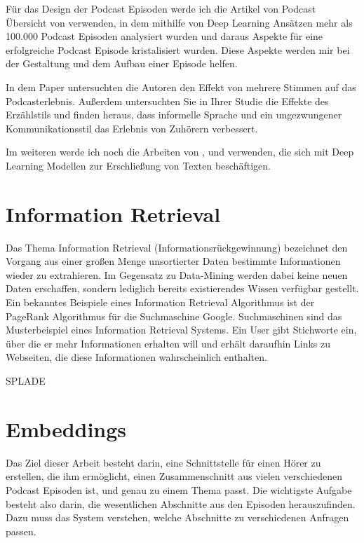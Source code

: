 Für das Design der Podcast Episoden werde ich die Artikel von Podcast Übersicht von \cite{jones2021} verwenden, in dem mithilfe von Deep Learning Ansätzen mehr als 100.000 Podcast Episoden analysiert wurden und daraus Aspekte für eine erfolgreiche Podcast Episode kristalisiert wurden. Diese Aspekte werden mir bei der Gestaltung und dem Aufbau einer Episode helfen. 

In dem Paper \cite{kang2012} untersuchten die Autoren den Effekt von mehrere Stimmen auf das Podcasterlebnis. Außerdem untersuchten Sie in Ihrer Studie die Effekte des Erzählstils und finden heraus, dass informelle Sprache und ein ungezwungener Kommunikationsstil das Erlebnis von Zuhörern verbessert. 



Im weiteren werde ich noch die Arbeiten von \cite{maroni2020}, \cite{clark2020} und \cite{du2017} verwenden, die sich mit Deep Learning Modellen zur Erschließung von Texten beschäftigen.

\section{Information Retrieval}

Das Thema Information Retrieval (Informationsrückgewinnung) bezeichnet den Vorgang aus einer großen Menge unsortierter Daten bestimmte Informationen wieder zu extrahieren.
Im Gegensatz zu Data-Mining werden dabei keine neuen Daten erschaffen, sondern lediglich bereits existierendes Wissen verfügbar gestellt.
Ein bekanntes Beispiele eines Information Retrieval Algorithmus ist der PageRank Algorithmus für die Suchmaschine Google.
Suchmaschinen sind das Musterbeispiel eines Information Retrieval Systems.
Ein User gibt Stichworte ein, über die er mehr Informationen erhalten will und erhält daraufhin Links zu Webseiten, die diese Informationen wahrscheinlich enthalten.

SPLADE

\section{Embeddings}

Das Ziel dieser Arbeit besteht darin, eine Schnittstelle für einen Hörer zu erstellen, die ihm ermöglicht, einen Zusammenschnitt aus vielen verschiedenen Podcast Episoden ist, und genau zu einem Thema passt. 
Die wichtigste Aufgabe besteht also darin, die wesentlichen Abschnitte aus den Episoden herauszufinden. 
Dazu muss das System verstehen, welche Abschnitte zu verschiedenen Anfragen passen. 

